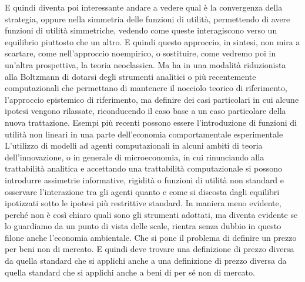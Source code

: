 \documentclass[a4paper, headings=standardclasses]{scrartcl}
\begin{document}
E quindi diventa poi interessante andare a vedere qual è la convergenza della strategia,
oppure nella simmetria delle funzioni di utilità, permettendo di avere funzioni di utilità simmetriche,
vedendo come queste interagiscono verso un equilibrio piuttosto che un altro.
E quindi questo approccio, in sintesi,
non mira a scartare, come nell'approccio noempirico, o sostituire, come vedremo poi in un'altra prospettiva, la teoria neoclassica.
Ma ha in una modalità riduzionista alla Boltzmann di dotarsi degli strumenti analitici o più recentemente computazionali
che permettano di mantenere il nocciolo teorico di riferimento, l'approccio epistemico di riferimento,
ma definire dei casi particolari in cui alcune ipotesi vengono rilassate,
riconducendo il caso base a un caso particolare della nuova trattazione.
Esempi più recenti possono essere l'introduzione di funzioni di utilità non lineari
in una parte dell'economia comportamentale esperimentale
L'utilizzo di modelli ad agenti computazionali in alcuni ambiti di teoria dell'innovazione,
o in generale di microeconomia, in cui rinunciando alla trattabilità analitica
e accettando una trattabilità computazionale
si possono introdurre assimetrie informative, rigidità
o funzioni di utilità non standard
e osservare l'interazione tra gli agenti quanto e come si discosta
dagli equilibri ipotizzati sotto le ipotesi più restrittive standard.
In maniera meno evidente,
perché non è così chiaro quali sono gli strumenti adottati,
ma diventa evidente se lo guardiamo da un punto di vista delle scale,
rientra senza dubbio in questo filone anche l'economia ambientale.
Che si pone il problema di definire un prezzo per beni non di mercato.
E quindi deve trovare una definizione di prezzo diversa da quella standard
che si applichi anche a una definizione di prezzo diversa da quella standard
che si applichi anche a beni di per sé non di mercato.
\end{document}
